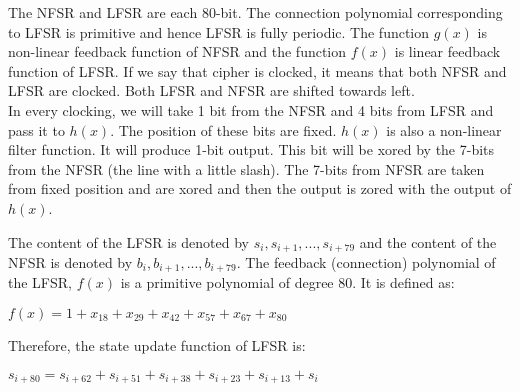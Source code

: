 \documentclass[11pt]{article}
\begin{document}
\begin{center}
\end{center}

The NFSR and LFSR are each 80-bit. The connection polynomial corresponding to LFSR is primitive and hence LFSR is fully periodic. The function $g(x)$ is non-linear feedback function  of NFSR and the function $f(x)$ is linear feedback function of LFSR. If we say that cipher is clocked, it means that both NFSR and LFSR are clocked. Both LFSR and NFSR are shifted towards left.\\
\newline
In every clocking, we will take 1 bit from the NFSR and 4 bits from LFSR and pass it to $h(x)$. The position of these bits are fixed. $h(x)$ is also a non-linear filter function. It will produce 1-bit output. This bit will be xored by the 7-bits from the NFSR (the line with a little slash). The 7-bits from NFSR are taken from fixed position and are xored and then the output is zored with the output of $h(x)$.\\
\newline


The content of the LFSR is denoted by $s_i, s_{i+1}, . . . , s_{i+79}$ and the content of the NFSR is denoted by $b_i, b_{i+1}, . . . , b_{i+79}$.
The feedback (connection) polynomial of the LFSR, $f(x)$ is a primitive polynomial of degree
80. It is defined as:
\begin{center}
    $f(x) = 1 + x_{18} + x_{29} + x_{42} + x_{57} + x_{67} + x_{80}$
\end{center}
Therefore, the state update function of LFSR is:
\begin{center}
    $s_{i+80} = s_{i+62} + s_{i+51} + s_{i+38} + s_{i+23} + s_{i+13} + s_i$
\end{center}
\end{document}
